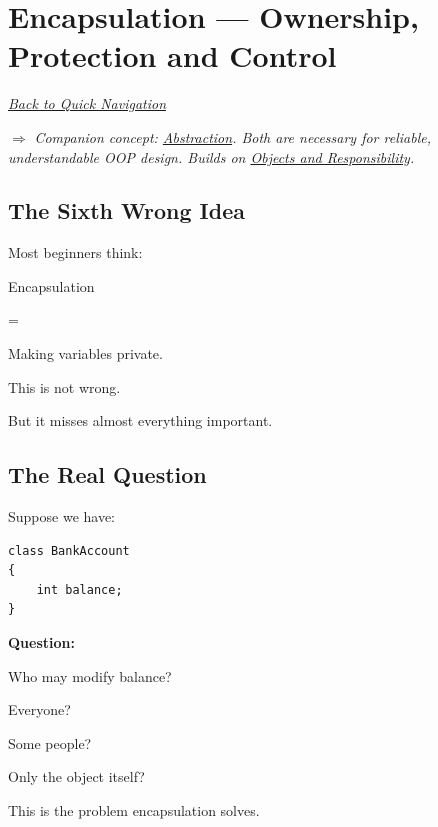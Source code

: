 \documentclass[11pt,a4paper]{book}
\begin{document}
\chapter{Encapsulation --- Ownership, Protection and Control}\label{chap:encapsulation}

\smallskip
\noindent
\hyperref[sec:quick_nav]{\emph{Back to Quick Navigation}}

\smallskip
\noindent
\textcolor{RosettaRoyalPurple}{$\Rightarrow$}
\emph{Companion concept: \hyperref[chap:abstraction]{Abstraction}. Both are necessary for reliable, understandable OOP design. Builds on \hyperref[chap:objects_identity]{Objects and Responsibility}.}


\section{The Sixth Wrong Idea}

\begin{trap}

Most beginners think:

Encapsulation

=

Making variables private.

This is not wrong.

But it misses almost everything important.

\end{trap}


\section{The Real Question}

Suppose we have:

\begin{verbatim}
class BankAccount
{
    int balance;
}
\end{verbatim}

\textbf{Question:}

Who may modify balance?

Everyone?

Some people?

Only the object itself?

This is the problem encapsulation solves.
\end{document}
